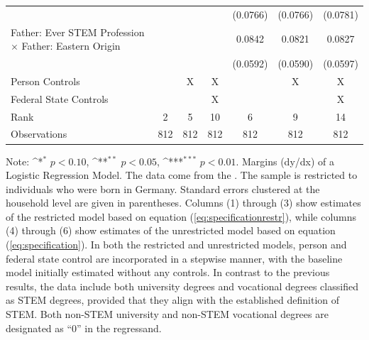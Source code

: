 \documentclass[a4paper, oneside, hyperfootnotes = false]{article}
\def\sym#1{\ifmmode^{#1}\else\(^{#1}\)\fi}
\begin{document}
{\begin{landscape}
\begin{table}[ht]
\begin{center}
{\begin{tabular}{l*{6}{c}}
					&                     &                     &                     &    (0.0766)         &    (0.0766)         &    (0.0781)         \\
					\addlinespace
					Father: Ever STEM Profession $\times$ Father: Eastern Origin&                     &                     &                     &      0.0842         &      0.0821         &      0.0827         \\
					&                     &                     &                     &    (0.0592)         &    (0.0590)         &    (0.0597)         \\
					\midrule
					Person Controls & & X  & X & & X & X \\
					Federal State Controls & & & X & & & X \\
					Rank                &      2         &      5         &     10         &      6         &      9         &     14         \\
					Observations &    812         &    812         &    812         &    812         &    812         &   812         \\
					\bottomrule
			\end{tabular}}
			
			\vspace{2mm}
			
			\parbox{15cm}{
				\linespread{1}\footnotesize Note: \sym{*} \(p<0.10\), \sym{**} \(p<0.05\), \sym{***} \(p<0.01\). Margins (dy/dx) of a Logistic Regression Model. The data come from the \cite{SOEP2023}. The sample is restricted to individuals who were born in Germany. Standard errors clustered at the household level are given in parentheses. Columns (1) through (3) show estimates of the restricted model based on equation (\ref{eq:specificationrestr}), while columns (4) through (6) show estimates of the unrestricted model based on equation (\ref{eq:specification}). In both the restricted and unrestricted models, person and federal state control are incorporated in a stepwise manner, with the baseline model initially estimated without any controls. In contrast to the previous results, the data include both university degrees and vocational degrees classified as STEM degrees, provided that they align with the established definition of STEM. Both non-STEM university and non-STEM vocational degrees are designated as ``0'' in the regressand.}
			
		\end{center}
	\end{table}
\end{landscape}

}
\end{document}

